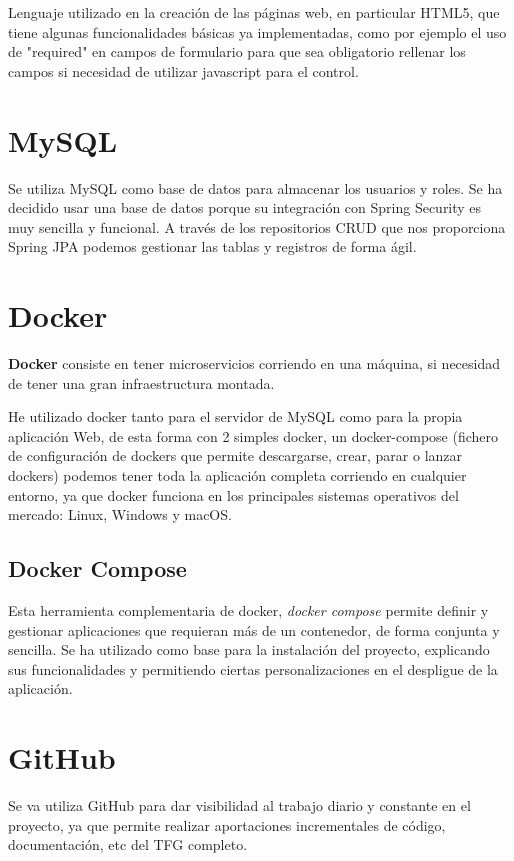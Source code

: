 Lenguaje utilizado en la creación de las páginas web, en particular HTML5, que tiene algunas funcionalidades básicas ya implementadas, como por ejemplo el uso de "required" en campos de formulario para que sea obligatorio rellenar los campos si necesidad de utilizar javascript para el control.

\section{MySQL}

Se utiliza MySQL como base de datos para almacenar los usuarios y roles.
Se ha decidido usar una base de datos porque su integración con Spring Security es muy sencilla y funcional. 
A través de los repositorios CRUD que nos proporciona Spring JPA podemos gestionar las tablas y registros de forma ágil.

\section{Docker}

\textbf{Docker} consiste en tener microservicios corriendo en una máquina, si necesidad de tener una gran infraestructura montada.

He utilizado docker tanto para el servidor de MySQL como para la propia aplicación Web, de esta forma con 2 simples docker, un docker-compose (fichero de configuración de dockers que permite descargarse, crear, parar o lanzar dockers) podemos tener toda la aplicación completa corriendo en cualquier entorno, ya que docker funciona en los principales sistemas operativos del mercado: Linux, Windows y macOS.

\subsection{Docker Compose}

Esta herramienta complementaria de docker, \textit{docker compose} \cite{web:dockercompose} permite definir y gestionar aplicaciones que requieran más de un contenedor, de forma conjunta y sencilla.
Se ha utilizado como base para la instalación del proyecto, explicando sus funcionalidades y permitiendo ciertas personalizaciones en el despligue de la aplicación.

\section{GitHub}

Se va utiliza GitHub para dar visibilidad al trabajo diario y constante en el proyecto, ya que permite realizar aportaciones incrementales de código, documentación, etc del TFG completo.

